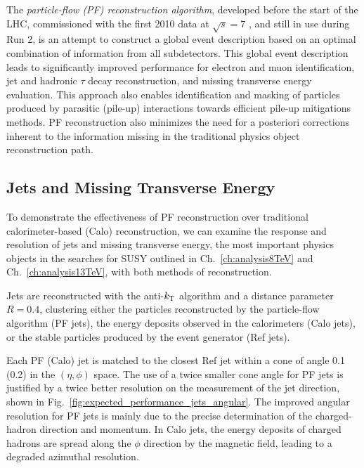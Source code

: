 The \emph{particle-flow (PF) reconstruction algorithm}, developed before the start of the
LHC, commissioned with the first 2010 data at
$\sqrt{s}=7$ \TeV, and still in use during Run 2, is an attempt to
construct a global event description based on an optimal combination
of information from all subdetectors.
This global event description leads to significantly improved performance for electron and muon identification, jet and
hadronic $\tau$ decay reconstruction, and missing transverse energy
evaluation. This approach also enables identification and masking of
particles produced by parasitic (pile-up) interactions towards
efficient pile-up mitigations methods. PF reconstruction also minimizes the need
for a posteriori corrections inherent to the information missing in
the traditional physics object reconstruction path. 

\subsection{Jets and Missing Transverse Energy}

To demonstrate the effectiveness of PF reconstruction over traditional
calorimeter-based (Calo) reconstruction, we can examine the response
and resolution of jets and missing transverse energy, the most
important physics objects in the searches for SUSY outlined in
Ch.~\ref{ch:analysis8TeV} and Ch.~\ref{ch:analysis13TeV}, with both
methods of reconstruction.

Jets are reconstructed with the anti-$k_{\mathrm{T}}$ algorithm
\cite{antikt,fastjet} and a distance parameter $R=0.4$, clustering either the particles reconstructed by the
particle-flow algorithm (PF jets), the energy deposits observed in the
calorimeters (Calo jets), or the stable particles produced by the
event generator (Ref jets).

Each PF (Calo) jet is matched to the closest Ref jet within a cone of
angle 0.1 (0.2) in the $(\eta, \phi)$ space. The use of a twice
smaller cone angle for PF jets is justified by a twice better
resolution on the measurement of the jet direction, shown in
Fig.~\ref{fig:expected_performance_jets_angular}. 
The improved angular resolution for PF jets is mainly due
to the precise determination of the charged-hadron direction and
momentum. In Calo jets, the energy deposits of charged hadrons are spread
along the $\phi$ direction by the magnetic field, leading to a
degraded azimuthal resolution. 

